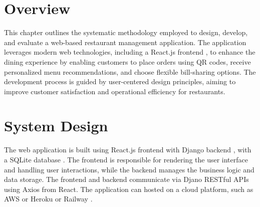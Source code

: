 \section{Overview}
This chapter outlines the systematic methodology employed to design, develop, and evaluate a web-based restaurant management application. The application leverages modern web technologies, including a React.js frontend \cite{15}, to enhance the dining experience by enabling customers to place orders using QR codes, receive personalized menu recommendations, and choose flexible bill-sharing options. The development process is guided by user-centered design principles, aiming to improve customer satisfaction and operational efficiency for restaurants.

\section{System Design}
The web application is built using React.js \cite{15}frontend with Django backend \cite{16}, with a SQLite database \cite{17}. The frontend is responsible for rendering the user interface and handling user interactions, while the backend manages the business logic and data storage. The frontend and backend communicate via Djano RESTful APIs \cite{15}using Axios \cite{18} from React. The application can hosted on a cloud platform, such as AWS \cite{23} or Heroku \cite{24} or Railway \cite{25}.

